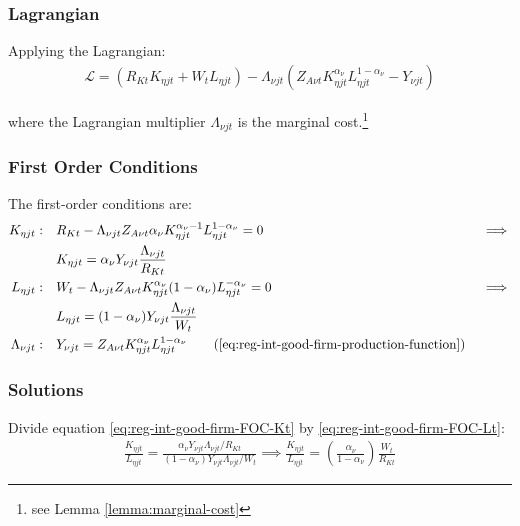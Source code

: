 \documentclass[
thesis.tex
]{subfiles}
\begin{document}

\subsubsection*{Lagrangian}

Applying the Lagrangian:
\begin{align}
	\label{eq:reg-int-good-firm-lagrangian}
	\mathcal{L} = (R_{Kt} K_{\eta jt} + W_t L_{\eta jt}) - \Lambda_{\nu jt} (Z_{A\nu t} K_{\eta jt}^{\alpha_\nu} L_{\eta jt}^{1-{\alpha_\nu}} - Y_{\nu jt})
\end{align}

where the Lagrangian multiplier $\Lambda_{\nu jt}$ is the marginal cost.\footnote{see Lemma \ref{lemma:marginal-cost}}

\subsubsection*{First Order Conditions}

The first-order conditions are:
\begin{alignat}{2}
	K_{\eta jt}: \quad & R_{Kt} - \Lambda_{\nu jt} Z_{A\nu t} {\alpha_\nu} K_{\eta jt}^{{\alpha_\nu}-1} L_{\eta jt}^{1-{\alpha_\nu}} = 0 &&\implies \nonumber \\
	& K_{\eta jt} = {\alpha_\nu} Y_{\nu jt} \frac{\Lambda_{\nu jt}}{R_{Kt}} \label{eq:reg-int-good-firm-FOC-Kt} \\
	L_{\eta jt}: \quad & W_t - \Lambda_{\nu jt} Z_{A\nu t} K_{\eta jt}^{\alpha_\nu} (1-{\alpha_\nu}) L_{\eta jt}^{-{\alpha_\nu}} = 0 \quad &&\implies \nonumber \\ 
	& L_{\eta jt} = (1-{\alpha_\nu}) Y_{\nu jt} \frac{\Lambda_{\nu jt}}{W_t} \label{eq:reg-int-good-firm-FOC-Lt} \\
	\Lambda_{\nu jt}: \quad & Y_{\nu jt} = Z_{A\nu t} K_{\eta jt}^{\alpha_\nu} L_{\eta jt}^{1-{\alpha_\nu}} \tag{\ref{eq:reg-int-good-firm-production-function}}
\end{alignat}

\subsubsection*{Solutions}

Divide equation \ref{eq:reg-int-good-firm-FOC-Kt} by \ref{eq:reg-int-good-firm-FOC-Lt}:
\begin{align}
	\frac{K_{\eta jt}}{L_{\eta jt}} = \frac{{\alpha_\nu} Y_{\nu jt} \Lambda_{\nu jt} /R_{Kt}}{(1-{\alpha_\nu}) Y_{\nu jt} \Lambda_{\nu jt} /W_t} \implies
	\frac{K_{\eta jt}}{L_{\eta jt}} = \left( \frac{{\alpha_\nu}}{1-{\alpha_\nu}} \right) \frac{W_t}{R_{Kt}} \label{eq:reg-int-good-firm-TMRS}
\end{align}
\end{document}
